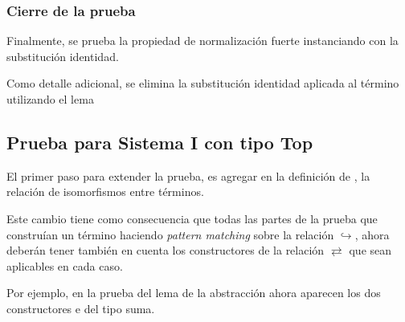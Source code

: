 \subsubsection{Cierre de la prueba}

Finalmente, se prueba la propiedad de normalización fuerte instanciando  con la substitución identidad.

Como detalle adicional, se elimina la substitución identidad aplicada al término utilizando el lema
\AgdaSymbol{:}
\AgdaSymbol{\}}
\AgdaSymbol{\{}
\AgdaSymbol{:}
\AgdaSymbol{\}}


\subsection{Prueba para Sistema I con tipo Top}

El primer paso para extender la prueba, es agregar en la definición de , la relación de isomorfismos entre términos.


Este cambio tiene como consecuencia que todas las partes de la prueba que construían un término \snstar haciendo \textit{pattern matching} sobre la relación $\hookrightarrow$, ahora deberán tener también en cuenta los constructores de la relación $\rightleftarrows$ que sean aplicables en cada caso.

\iffalse
Por ejemplo, en la prueba de \func{SN*-rename} ahora aparecen los dos constructores \const{inj₁} y \const{inj₂} del tipo suma.

\ExecuteMetaData[code/strong_norm.tex]{sn-rename}

Para esta prueba es necesario definir un nuevo lema análogo a \func{rename↪}.

\ExecuteMetaData[code/strong_norm.tex]{rename-iso-type}

Una modificación similar se realiza para extender el lema de la abstracción.
\fi

Por ejemplo, en la prueba del lema de la abstracción ahora aparecen los dos constructores  e  del tipo suma.


